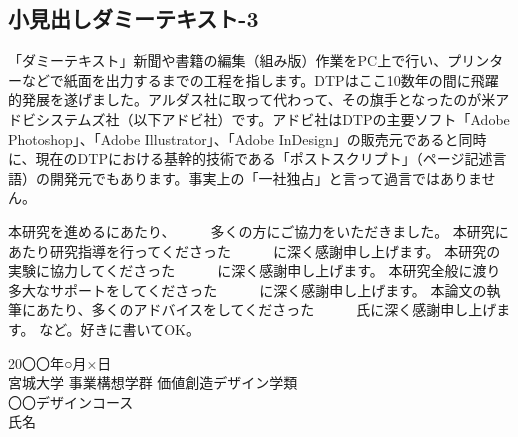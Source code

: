 \documentclass{cuxarticle}
\begin{document}
\subsection{小見出しダミーテキスト-3}
「ダミーテキスト」新聞や書籍の編集（組み版）作業をPC上で行い、プリンターなどで紙面を出力するまでの工程を指します。DTPはここ10数年の間に飛躍的発展を遂げました。アルダス社に取って代わって、その旗手となったのが米アドビシステムズ社（以下アドビ社）です。アドビ社はDTPの主要ソフト「Adobe Photoshop」、「Adobe Illustrator」、「Adobe InDesign」の販売元であると同時に、現在のDTPにおける基幹的技術である「ポストスクリプト」（ページ記述言語）の開発元でもあります。事実上の「一社独占」と言って過言ではありません。


本研究を進めるにあたり、　　　多くの方にご協力をいただきました。
本研究にあたり研究指導を行ってくださった　　　に深く感謝申し上げます。
本研究の実験に協力してくださった　　　に深く感謝申し上げます。
本研究全般に渡り多大なサポートをしてくださった　　　に深く感謝申し上げます。
本論文の執筆にあたり、多くのアドバイスをしてくださった　　　氏に深く感謝申し上げます。
など。好きに書いてOK。

\vspace{3\zh}
\begin{flushright}
  20〇〇年○月×日 \\
  宮城大学 事業構想学群 価値創造デザイン学類 \\
  〇〇デザインコース \\
  氏名
\end{flushright}
\end{document}
